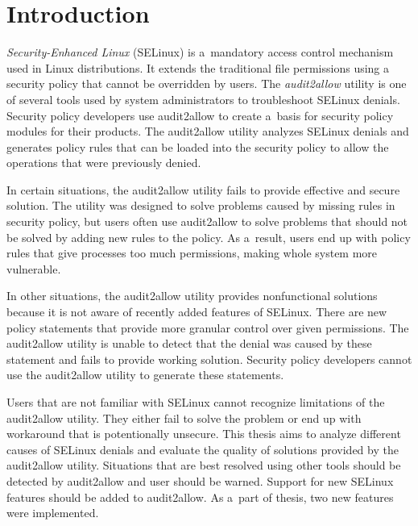 \chapter{Introduction}

\emph{Security-Enhanced Linux} (SELinux) is a~mandatory access control mechanism
used in Linux distributions. It extends the traditional file permissions using a
security policy that cannot be overridden by users. The \emph{audit2allow}
utility is one of several tools used by system administrators to troubleshoot
SELinux denials. Security policy developers use audit2allow to create a~basis
for security policy modules for their products. The audit2allow utility analyzes
SELinux denials and generates policy rules that can be loaded into the security
policy to allow the operations that were previously denied.

In certain situations, the audit2allow utility fails to provide effective and
secure solution. The utility was designed to solve problems caused by missing
rules in security policy, but users often use audit2allow to solve problems that
should not be solved by adding new rules to the policy. As a~result, users end
up with policy rules that give processes too much permissions, making whole
system more vulnerable.

In other situations, the audit2allow utility provides nonfunctional solutions
because it is not aware of recently added features of SELinux. There are new
policy statements that provide more granular control over given permissions. The
audit2allow utility is unable to detect that the denial was caused by these
statement and fails to provide working solution. Security policy developers
cannot use the audit2allow utility to generate these statements.

Users that are not familiar with SELinux cannot recognize limitations of the
audit2allow utility. They either fail to solve the problem or end up with
workaround that is potentionally unsecure.
This thesis aims to analyze different causes of SELinux denials and evaluate the
quality of solutions provided by the audit2allow utility. Situations that are
best resolved using other tools should be detected by audit2allow and user
should be warned. Support for new SELinux features should be added to
audit2allow. As a~part of thesis, two new features were implemented.

